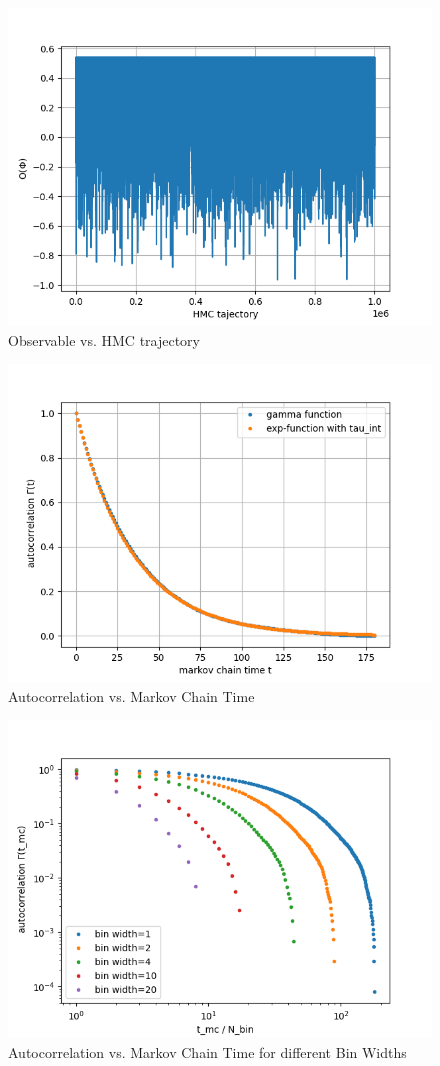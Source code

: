 \documentclass{article}
\begin{document}
\begin{enumerate}
\begin{figure}[h!]
    \centering
    \includegraphics[width=.8\linewidth]{observable_markov_chain_1mio.png}
    \caption{Observable vs. HMC trajectory}
    \label{fig:hmc}
\end{figure}

\begin{figure}[h!]
    \centering
    \includegraphics[width=.8\linewidth]{autocorr_func_vs_tau_int.png}
    \caption{Autocorrelation vs. Markov Chain Time}
    \label{fig:autocorr-exp}
\end{figure}

\begin{figure}[h!]
    \centering
    \includegraphics[width=.8\linewidth]{autocorr_different_binwidth.png}
    \caption{Autocorrelation vs. Markov Chain Time for different Bin Widths}
    \label{fig:autocorr-bin}
\end{figure}


\end{enumerate}
\end{document}
